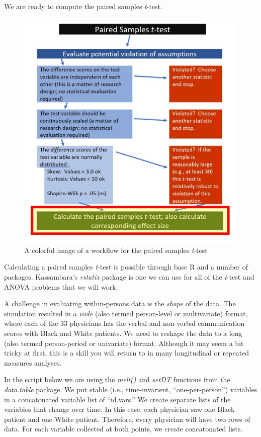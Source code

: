 \documentclass[
  11pt,
]{book}
\begin{document}
We are ready to compute the paired samples \emph{t}-test.

\begin{figure}
\centering
\includegraphics{images/ttests/PairedT.jpg}
\caption{A colorful image of a workflow for the paired samples \emph{t}-test}
\end{figure}

Calculating a paired samples \emph{t}-test is possible through base R and a number of packages. Kassambara's \citeyearpar{kassambara_pipe-friendly_nodate} \emph{rstatix} package is one we can use for all of the \emph{t}-test and ANOVA problems that we will work.

A challenge in evaluating within-persons data is the \emph{shape} of the data. The simulation resulted in a \emph{wide} (also termed person-level or multivariate) format, where each of the 33 physicians has the verbal and non-verbal communication scores with Black and White patients. We need to reshape the data to a long (also termed person-period or univariate) format. Although it may seem a bit tricky at first, this is a skill you will return to in many longitudinal or repeated measures analyses.

In the script below we are using the \emph{melt()} and \emph{setDT} functions from the \emph{data.table} package. We put stable (i.e., time-invarient, ``one-per-person'') variables in a concatonated variable list of ``id.vars.'' We create separate lists of the variables that change over time. In this case, each physician saw one Black patient and one White patient. Therefore, every physician will have two rows of data. For each variable collected at both points, we create concatonated lists.
\end{document}
